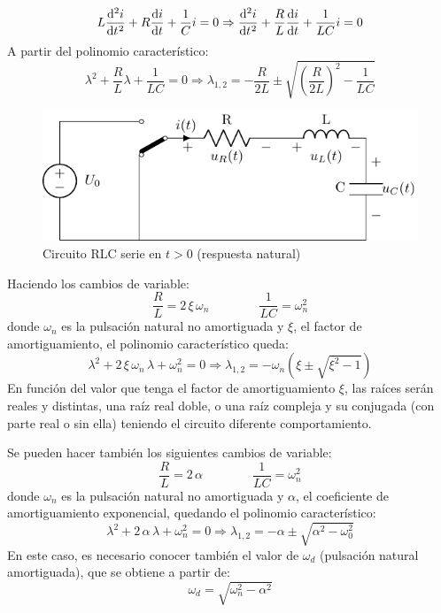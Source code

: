 \[
  L\diff[2]{i}{t} + R\diff{i}{t} + \frac{1}{C} i = 0 \Rightarrow
  {\diff[2]{i}{t} + \frac{R}{L} \diff{i}{t} + \frac{1}{LC} i = 0}
\]
A partir del polinomio característico:
\[
  \lambda^2 + \frac{R}{L} \lambda + \frac{1}{LC} = 0 \Rightarrow
  \lambda_{1,2} = -\frac{R}{2L} \pm \sqrt{\left(\frac{R}{2L}\right)^2
    - \frac{1}{LC}}
\]
\begin{figure}[H]
  \centering
  \includegraphics{../figs/transitorio_circuitoRLC_serie_t0+.pdf}
  \caption{Circuito RLC serie en $t>0$ (respuesta natural)}
  \label{fig:transitorio_serie_t0+}
\end{figure}

Haciendo los cambios de variable:
\begin{equation*} {\dfrac{R}{L}=2\,\xi\,\omega_n}\qquad \qquad
  {\dfrac{1}{LC}=\omega_n^2}
\end{equation*}
donde $\omega_n$ es la pulsación natural no amortiguada y $\xi$, el
factor de amortiguamiento, el polinomio característico queda:
\begin{equation*}
  \lambda^2+2\,\xi\,\omega_n\,\lambda + \omega_n^2=0 \Rightarrow \lambda_{1,2}=-\omega_n\left(\xi\pm\sqrt{\xi^2-1}\right)
\end{equation*}
En función del valor que tenga el factor de amortiguamiento $\xi$, las
raíces serán reales y distintas, una raíz real doble, o una raíz
compleja y su conjugada (con parte real o sin ella) teniendo el
circuito diferente comportamiento.
	
\begin{remark}
  Se pueden hacer también los siguientes cambios de variable:
  \begin{equation*} {\dfrac{R}{L}=2\,\alpha}\qquad \qquad
    {\dfrac{1}{LC}=\omega_n^2}
  \end{equation*}
  donde $\omega_n$ es la pulsación natural no amortiguada y $\alpha$,
  el coeficiente de amortiguamiento exponencial, quedando el polinomio
  característico:
  \begin{equation*}
    \lambda^2+2\,\alpha\,\lambda + \omega_n^2=0 \Rightarrow \lambda_{1,2}=-\alpha \pm \sqrt{\alpha^2 - \omega_0^2}
  \end{equation*}
  En este caso, es necesario conocer también el valor de $\omega_d$
  (pulsación natural amortiguada), que se obtiene a partir de:
  \begin{equation*}
    \omega_d=\sqrt{\omega_n^2-\alpha^2}
  \end{equation*}
\end{remark}
	
